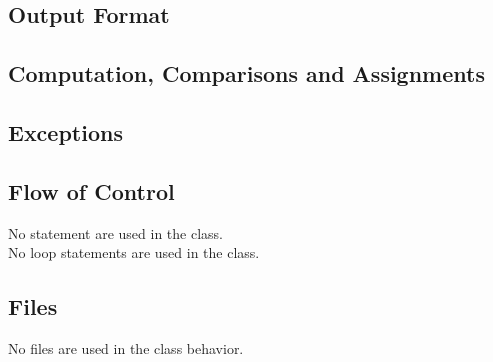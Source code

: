 \subsection{Output Format}
\subsection{Computation, Comparisons and Assignments}
\subsection{Exceptions}
\subsection{Flow of Control}
No  statement are used in the class.\\
No loop statements are used in the class.
\subsection{Files}
No files are used in the class behavior.